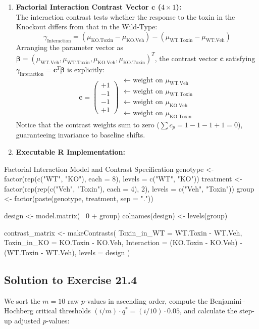 \documentclass[11pt,twoside,openright]{book}
\begin{document}
\begin{enumerate}
    \item \textbf{Factorial Interaction Contrast Vector $\mathbf{c}$ ($4 \times 1$):}\\
    The interaction contrast tests whether the response to the toxin in the Knockout differs from that in the Wild-Type:
    $$\gamma_{\text{Interaction}} = (\mu_{\text{KO.Toxin}} - \mu_{\text{KO.Veh}}) - (\mu_{\text{WT.Toxin}} - \mu_{\text{WT.Veh}})$$
    Arranging the parameter vector as $\boldsymbol{\beta} = (\mu_{\text{WT.Veh}}, \mu_{\text{WT.Toxin}}, \mu_{\text{KO.Veh}}, \mu_{\text{KO.Toxin}})^T$, the contrast vector $\mathbf{c}$ satisfying $\gamma_{\text{Interaction}} = \mathbf{c}^T \boldsymbol{\beta}$ is explicitly:
    $$\mathbf{c} = \begin{pmatrix} +1 \\ -1 \\ -1 \\ +1 \end{pmatrix}
    \begin{array}{l}
    \leftarrow \text{weight on } \mu_{\text{WT.Veh}} \\
    \leftarrow \text{weight on } \mu_{\text{WT.Toxin}} \\
    \leftarrow \text{weight on } \mu_{\text{KO.Veh}} \\
    \leftarrow \text{weight on } \mu_{\text{KO.Toxin}}
    \end{array}$$
    Notice that the contrast weights sum to zero ($\sum c_p = 1 - 1 - 1 + 1 = 0$), guaranteeing invariance to baseline shifts.
    
    \item \textbf{Executable R Implementation:}
\end{enumerate}

\begin{rchunk}{Factorial Interaction Model and Contrast Specification}
genotype  <- factor(rep(c("WT", "KO"), each = 8), levels = c("WT", "KO"))
treatment <- factor(rep(rep(c("Veh", "Toxin"), each = 4), 2), levels = c("Veh", "Toxin"))
group     <- factor(paste(genotype, treatment, sep = "."))

design <- model.matrix(~ 0 + group)
colnames(design) <- levels(group)

contrast_matrix <- makeContrasts(
  Toxin_in_WT  = WT.Toxin - WT.Veh,
  Toxin_in_KO  = KO.Toxin - KO.Veh,
  Interaction  = (KO.Toxin - KO.Veh) - (WT.Toxin - WT.Veh),
  levels = design
)
\end{rchunk}

\subsection*{Solution to Exercise 21.4}
We sort the $m = 10$ raw $p$-values in ascending order, compute the Benjamini--Hochberg critical thresholds $(i/m) \cdot q^* = (i/10) \cdot 0.05$, and calculate the step-up adjusted $p$-values:
\end{document}
